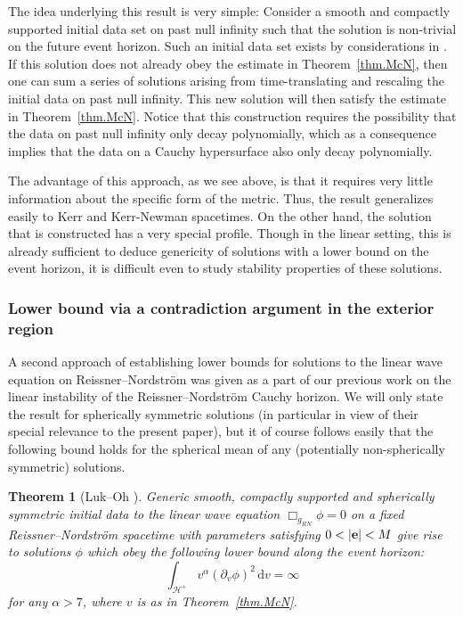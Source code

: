 \documentclass[10pt, reqno]{amsart}
\newtheorem{theorem}{Theorem}[section]
\theoremstyle{definition}
\theoremstyle{remark}
\theoremstyle{conjecture}
\numberwithin{equation}{section}
\newcommand{\ud}{\mathrm{d}}
\newcommand{\rd}{\partial}
\newcommand{\0}{\emptyset}
\newcommand{\alp}{\alpha}
\newcommand{\calH}{\mathcal H}
\newcommand{\EH}{\calH^{+}}
\begin{document}
The idea underlying this result is very simple: Consider a smooth and compactly supported initial data set on past null infinity such that the solution is non-trivial on the future event horizon. Such an initial data set exists by considerations in \cite{DRSR}. If this solution does not already obey the estimate in Theorem~\ref{thm.McN}, then one can sum a series of solutions arising from time-translating and rescaling the initial data on past null infinity. This new solution will then satisfy the estimate in Theorem~\ref{thm.McN}. Notice that this construction requires the possibility that the data on past null infinity only decay polynomially, which as a consequence implies that the data on a Cauchy hypersurface also only decay polynomially. 

The advantage of this approach, as we see above, is that it requires very little information about the specific form of the metric. Thus, the result generalizes easily to Kerr and Kerr-Newman spacetimes. On the other hand, the solution that is constructed has a very special profile. Though in the linear setting, this is already sufficient to deduce genericity of solutions with a lower bound on the event horizon, it is difficult even to study stability properties of these solutions.

\subsubsection{Lower bound via a contradiction argument in the exterior region}\label{sec.intro.LO.linear}

A second approach of establishing lower bounds for solutions to the linear wave equation on Reissner--Nordstr\"om was given as a part of our previous work \cite{LO.instab} on the linear instability of the Reissner--Nordstr\"om Cauchy horizon. We will only state the result for spherically symmetric solutions (in particular in view of their special relevance to the present paper), but it of course follows easily that the following bound holds for the spherical mean of any (potentially non-spherically symmetric) solutions.

\begin{theorem}[Luk--Oh \cite{LO.instab}]\label{linear.thm}
Generic smooth, compactly supported and spherically symmetric initial data to the linear wave equation $\Box_{g_{RN}}\phi=0$ on a fixed Reissner--Nordstr\"om spacetime with parameters satisfying $0<|{\bf e}|<M$ give rise to solutions $\phi$ which obey the following lower bound along the event horizon:
$$\int_{\EH} v^{\alp} (\rd_{v} \phi)^{2} \, \ud v = \infty$$
for any $\alp>7$, where $v$ is as in Theorem~\ref{thm.McN}.
\end{theorem}
\end{document}
